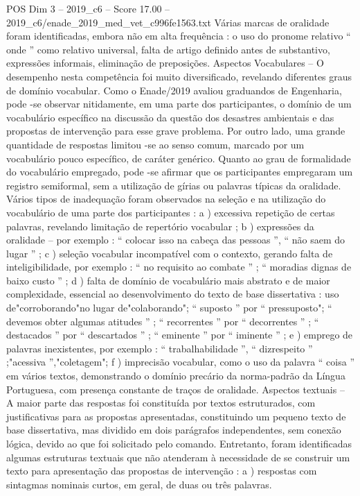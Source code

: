 \begin{textsample}{POS Dim 3 – 2019\_c6 – Score 17.00 – 2019\_c6/enade\_2019\_med\_vet\_c996fe1563.txt}
Várias marcas de oralidade foram identificadas, embora não em alta frequência : o uso do pronome relativo “ onde ” como relativo universal, falta de artigo definido antes de substantivo, expressões informais, eliminação de preposições.
Aspectos Vocabulares – O desempenho nesta competência foi muito diversificado, revelando diferentes graus de domínio vocabular.
Como o Enade/2019 avaliou graduandos de Engenharia, pode -se observar nitidamente, em uma parte dos participantes, o domínio de um vocabulário específico na discussão da questão dos desastres ambientais e das propostas de intervenção para esse grave problema.
Por outro lado, uma grande quantidade de respostas limitou -se ao senso comum, marcado por um vocabulário pouco específico, de caráter genérico.
Quanto ao grau de formalidade do vocabulário empregado, pode -se afirmar que os participantes empregaram um registro semiformal, sem a utilização de gírias ou palavras típicas da oralidade.
Vários tipos de inadequação foram observados na seleção e na utilização do vocabulário de uma parte dos participantes : a ) excessiva repetição de certas palavras, revelando limitação de repertório vocabular ; b ) expressões da oralidade – por exemplo : “ colocar isso na cabeça das pessoas ”, “ não saem do lugar ” ; c ) seleção vocabular incompatível com o contexto, gerando falta de inteligibilidade, por exemplo : “ no requisito ao combate ” ; “ moradias dignas de baixo custo ” ; d ) falta de domínio de vocabulário mais abstrato e de maior complexidade, essencial ao desenvolvimento do texto de base dissertativa : uso de"corroborando"no lugar de"colaborando"; “ suposto ” por “ pressuposto"; “ devemos obter algumas atitudes ” ; “ recorrentes ” por “ decorrentes ” ; “ destacados ” por “ descartados ” ; “ eminente ” por “ iminente ” ; e ) emprego de palavras inexistentes, por exemplo : “ trabalhabilidade ”, “ dizrespeito ” ;"acessiva ”,"coletagem"; f ) imprecisão vocabular, como o uso da palavra “ coisa ” em vários textos, demonstrando o domínio precário da norma-padrão da Língua Portuguesa, com presença constante de traços de oralidade.
Aspectos textuais – A maior parte das respostas foi constituída por textos estruturados, com justificativas para as propostas apresentadas, constituindo um pequeno texto de base dissertativa, mas dividido em dois parágrafos independentes, sem conexão lógica, devido ao que foi solicitado pelo comando.
Entretanto, foram identificadas algumas estruturas textuais que não atenderam à necessidade de se construir um texto para apresentação das propostas de intervenção : a ) respostas com sintagmas nominais curtos, em geral, de duas ou três palavras.

\end{textsample}

